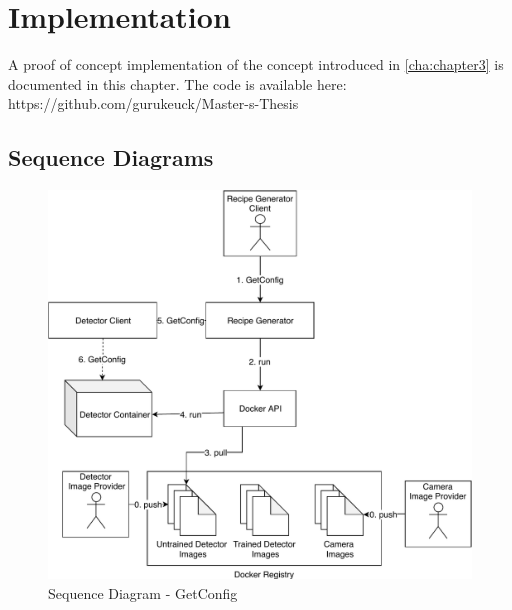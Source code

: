\chapter{Implementation\label{cha:chapter4}}
A proof of concept implementation of the concept introduced in \ref{cha:chapter3} is documented in this chapter. The code is available here: https://github.com/gurukeuck/Master-s-Thesis

\section{Sequence Diagrams}
\begin{figure}[ht]
	\centering
  \includegraphics[width=\textwidth]{img/SequenceDiagram-GetConfig.pdf}
	\caption{Sequence Diagram - GetConfig}
	\label{fig:SequenceDiagram-GetConfig}
\end{figure}

